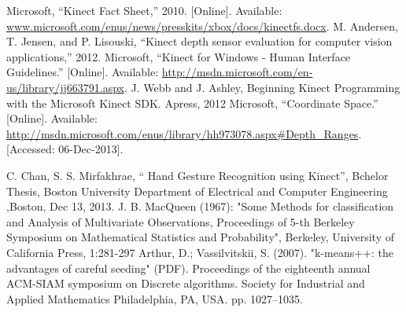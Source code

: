 \documentclass{report}           %
\begin{document}
\begin{thebibliography}{60}
 Microsoft, “Kinect Fact Sheet,” 2010. [Online]. Available: \url{www.microsoft.com/enus/news/presskits/xbox/docs/kinectfs.docx}.
M. Andersen, T. Jensen, and P. Lisouski, “Kinect depth sensor evaluation for computer
vision applications,” 2012.
Microsoft, “Kinect for Windows - Human Interface Guidelines.” [Online]. Available:
\url{http://msdn.microsoft.com/en-us/library/jj663791.aspx}.
J. Webb and J. Ashley, Beginning Kinect Programming with the Microsoft Kinect SDK.
Apress, 2012
Microsoft, “Coordinate Space.” [Online]. Available: \url{http://msdn.microsoft.com/enus/library/hh973078.aspx#Depth\_Ranges}.
[Accessed: 06-Dec-2013].

C. Chan, S. S. Mirfakhrae, “ Hand Gesture Recognition using
Kinect”, Bchelor Thesis, Boston University Department of
Electrical and Computer Engineering ,Boston, Dec 13, 2013.
J. B. MacQueen (1967): "Some Methods for classification and Analysis of Multivariate Observations, Proceedings of 5-th Berkeley Symposium on Mathematical Statistics and Probability", Berkeley, University of California Press, 1:281-297
Arthur, D.; Vassilvitskii, S. (2007). "k-means++: the advantages of careful seeding" (PDF). Proceedings of the eighteenth annual ACM-SIAM symposium on Discrete algorithms. Society for Industrial and Applied Mathematics Philadelphia, PA, USA. pp. 1027–1035.
\end{thebibliography}
\end{document}

